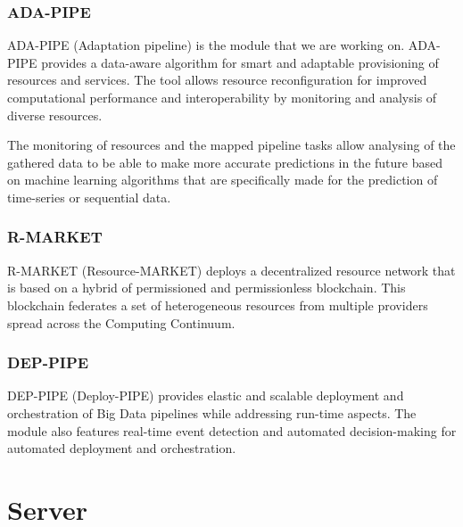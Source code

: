 \documentclass{article}
\begin{document}
        \subsubsection*{ADA-PIPE}
        \label{sec:adaptation-pipe-datacloud}
            
            ADA-PIPE (Adaptation pipeline) \cite{mehranADAPIPE2023} is the module that we are working on.
            ADA-PIPE provides a data-aware algorithm for smart and adaptable provisioning of resources and services. The tool allows resource reconfiguration for improved computational performance and interoperability by monitoring and analysis of diverse resources. 
            
            The monitoring of resources and the mapped pipeline tasks allow analysing of the gathered data to be able to make more accurate predictions in the future based on machine learning algorithms that are specifically made for the prediction of time-series or sequential data.
        
        \subsubsection*{R-MARKET}
        \label{sec:resource-market-datacloud}
            
            R-MARKET (Resource-MARKET) \cite{senguptaRMARKET} deploys a decentralized resource network that is based on a hybrid of permissioned and permissionless blockchain. This blockchain federates a set of heterogeneous resources from multiple providers spread across the Computing Continuum.
        
        \subsubsection*{DEP-PIPE}
        \label{sec:deploy-pipe-datacloud}
            
            DEP-PIPE (Deploy-PIPE) \cite{ledakisDEPPIPE} provides elastic and scalable deployment and orchestration of Big Data pipelines while addressing run-time aspects.
            The module also features real-time event detection and automated decision-making for automated deployment and orchestration.
            

        \section{Server}
        \label{sec:server}
\end{document}
